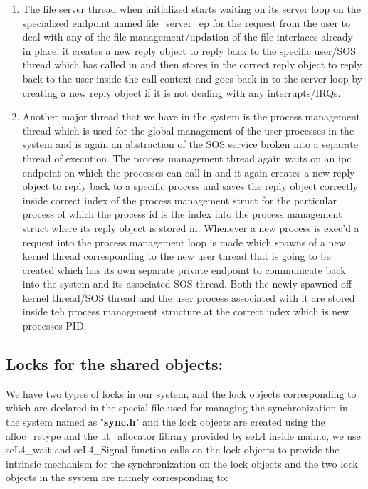 \begin{enumerate}
  \item The file server thread when initialized starts waiting on its server loop on the specialized endpoint named file\_server\_ep for the request from the user to deal with any of the file management/updation of the 
  file interfaces already in place, it creates a new reply object to reply back to the specific user/SOS thread which has called in and then stores in the correct reply object to reply back to the user inside the call context and goes back in to the 
  server loop by creating a new reply object if it is not dealing with any interrupts/IRQs.
  \item Another major thread that we have in the system is the process management thread which is used for the global management of the user processes in the system and is again an abstraction of the SOS service broken into a separate thread of execution.
  The process management thread again waits on an ipc endpoint on which the processes can call in and it again creates a new reply object to reply back to a specific process and saves the reply object correctly inside correct index of the process management struct for the particular process 
  of which the process id is the index into the process management struct where its reply object is stored in. Whenever a new process is exec'd  a request into the process management loop is made which spawns of a new kernel thread corresponding to the new 
  user thread that is going to be created which has its own separate private endpoint to communicate back into the system and its associated SOS thread. Both the newly spawned off kernel thread/SOS thread and the user process associated with it are stored inside teh process management structure at the correct index which is new processes PID.
\end{enumerate}

\subsection{Locks for the shared objects:}

We have two types of locks in our system, and the lock objects corresponding to which are declared in the special file used for managing the  
synchronization in the system named as "\textbf{sync.h}" and the lock objects are created using the alloc\_retype and the ut\_allocator 
library provided by seL4 inside main.c, we use seL4\_wait and seL4\_Signal function calls on the lock objects to provide the 
intrinsic mechanism for the synchronization on the lock objects and the two lock objects in the system are namely corresponding to:

